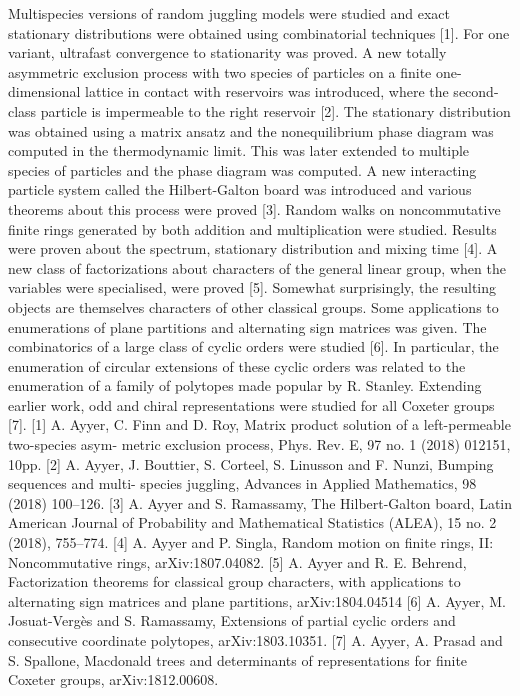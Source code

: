 Multispecies versions of random juggling models were studied and exact stationary distributions were obtained using combinatorial techniques [1]. For one variant, ultrafast convergence to stationarity was proved.  A new totally asymmetric exclusion process with two species of particles on a finite one-dimensional lattice in contact with reservoirs was introduced, where the second-class particle is impermeable to the right reservoir [2]. The stationary distribution was obtained using a matrix ansatz and the nonequilibrium phase diagram was computed in the thermodynamic limit. This was later extended to multiple species of particles and the phase diagram was computed.  A new interacting particle system called the Hilbert-Galton board was introduced and various theorems about this process were proved [3].  Random walks on noncommutative finite rings generated by both addition and multiplication were studied. Results were proven about the spectrum, stationary distribution and mixing time [4].  A new class of factorizations about characters of the general linear group, when the variables were specialised, were proved [5]. Somewhat surprisingly, the resulting objects are themselves characters of other classical groups. Some applications to enumerations of plane partitions and alternating sign matrices was given.  The combinatorics of a large class of cyclic orders were studied [6]. In particular, the enumeration of circular extensions of these cyclic orders was related to the enumeration of a family of polytopes made popular by R. Stanley.  Extending earlier work, odd and chiral representations were studied for all Coxeter groups [7].   [1] A. Ayyer, C. Finn and D. Roy, Matrix product solution of a left-permeable two-species asym- metric exclusion process, Phys. Rev. E, 97 no. 1 (2018) 012151, 10pp. [2] A. Ayyer, J. Bouttier, S. Corteel, S. Linusson and F. Nunzi, Bumping sequences and multi- species juggling, Advances in Applied Mathematics, 98 (2018) 100–126. [3] A. Ayyer and S. Ramassamy, The Hilbert-Galton board, Latin American Journal of Probability and Mathematical Statistics (ALEA), 15 no. 2 (2018), 755–774. [4] A. Ayyer and P. Singla, Random motion on finite rings, II: Noncommutative rings,  arXiv:1807.04082. [5] A. Ayyer and R. E. Behrend, Factorization theorems for classical group characters, with applications to alternating sign matrices and plane partitions, arXiv:1804.04514 [6]  A. Ayyer, M. Josuat-Vergès and S. Ramassamy, Extensions of partial cyclic orders and consecutive coordinate polytopes,  arXiv:1803.10351. [7]  A. Ayyer, A. Prasad and S. Spallone, Macdonald trees and determinants of representations for finite Coxeter groups, arXiv:1812.00608.  


